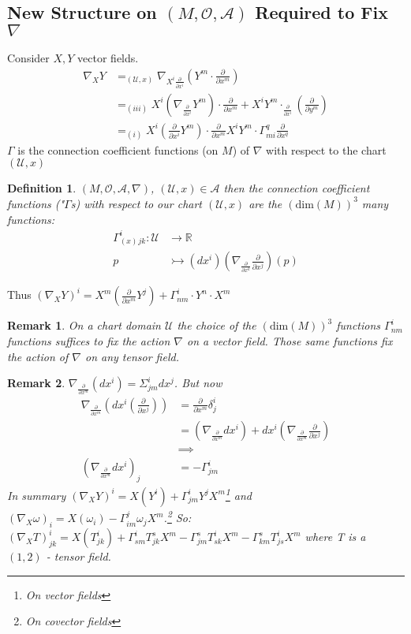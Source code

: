 \documentclass[10pt, oneside]{article}
\newcommand{\R}{\mathbb{R}}
\newtheorem{defn}{Definition}
\newtheorem{remark}{Remark}
\begin{document}
  \subsection{New Structure on $(M, \mathcal{O}, \mathcal{A})$ Required to Fix $\nabla$}
     Consider $X,Y$ vector fields.
     \begin{align*}
        \nabla_X Y &=_{(\mathcal{U},x)} \nabla_{X^i \frac{\partial}{\partial x^i}} (Y^m \cdot \frac{\partial}{\partial x^m}) \\
        &=_{(iii)} X^i (\nabla_{\frac{\partial}{\partial x^i}} Y^m) \cdot \frac{\partial}{\partial x^m} + X^i Y^m \cdot_{\frac{\partial}{\partial x^i}}(\frac{\partial}{\partial y^m}) \\
        &=_{(i)} X^i (\frac{\partial}{\partial x^i} Y^m) \cdot \frac{\partial}{\partial x^m} X^i Y^m \cdot \Gamma^q_{m i} \frac{\partial}{\partial x^q}
     \end{align*}
     $\Gamma$ is the connection coefficient functions (on $M$) of $\nabla$ with respect to the chart $(\mathcal{U},x)$
     \begin{defn}
        $(M,\mathcal{O},\mathcal{A},\nabla)$, $(\mathcal{U},x) \in \mathcal{A}$ then the connection coefficient functions ("$\Gamma$s) with respect to our chart $(\mathcal{U},x)$ are the $(\text{dim}(M))^3$ many functions:
        \begin{align*}
           \Gamma_(x)^i_{jk}: \mathcal{U} &\to \R \\
           p & \rightarrowtail (dx^i)(\nabla_{\frac{\partial}{\partial x^k}} \frac{\partial}{\partial x^j})(p)
        \end{align*}
     \end{defn}
     Thus $(\nabla_X Y)^i = X^m (\frac{\partial}{\partial x^m} Y^j)+\Gamma^i_{nm} \cdot Y^n \cdot X^m$
     \begin{remark}
        On a chart domain $\mathcal{U}$ the choice of the $(\text{dim}(M))^3$ functions $\Gamma^i_{n m}$ functions suffices to fix the action $\nabla$ on a vector field. Those same functions fix the action of $\nabla$ on any tensor field.
     \end{remark}
     \begin{remark}
        $\nabla_{\frac{\partial}{\partial x^m}} (dx^i) = \Sigma^i_{jm} dx^j$. But now
        \begin{align*}
           \nabla_{\frac{\partial}{\partial x^m}}(dx^i(\frac{\partial}{\partial x^j})) &= \frac{\partial}{\partial x^m} \delta^i_j \\
           &= (\nabla_{\frac{\partial}{\partial x^m}} dx^i) + dx^i (\nabla_{\frac{\partial}{\partial x^m}} \frac{\partial}{\partial x^j}) \\
           & \implies \\
           (\nabla_{\frac{\partial}{\partial x^m}} dx^i)_j &= - \Gamma^i_{jm}
        \end{align*}
        In summary $(\nabla_X Y)^i = X ( Y ^i) + \Gamma^i_{jm} Y^j X^m$\footnote{On vector fields} and $(\nabla_X \omega)_i = X(\omega_i) - \Gamma^j_{im} \omega_j X^m$.\footnote{On covector fields}
        So: $(\nabla_X T)^i_{jk} = X(T^i_{jk})+\Gamma^i_{sm} T^s_{jk} X^m - \Gamma^s_{jm} T^i_{sk} X^m - \Gamma^s_{km} T^i_{js} X^m$ where T is a $(1,2)$ - tensor field.
      \end{remark}
\end{document}
